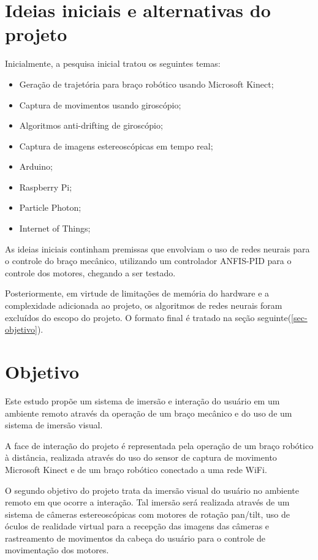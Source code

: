 		\section{Ideias iniciais e alternativas do projeto}\label{subsec-iniciais}
	
	Inicialmente, a pesquisa inicial tratou os seguintes temas:\par
	
	
	\begin{itemize}[noitemsep]
		\item Geração de trajetória para braço robótico usando Microsoft Kinect;
		\item Captura de movimentos usando giroscópio;
		\item Algoritmos anti-drifting de giroscópio;
		\item Captura de imagens estereoscópicas em tempo real;
		\item Arduino;
		\item Raspberry Pi;
		\item Particle Photon;
		\item Internet of Things;
	\end{itemize}
	As ideias iniciais continham premissas que envolviam o uso de redes neurais para o controle do braço mecânico, utilizando um controlador ANFIS-PID para o controle dos motores, chegando a ser testado.\par
	Posteriormente, em virtude de limitações de memória do hardware e a complexidade adicionada ao projeto, os algoritmos de redes neurais foram excluídos do escopo do projeto.
	O formato final é tratado na seção seguinte(\autoref{sec-objetivo}).
	\section{Objetivo}\label{sec-objetivo}

	Este estudo propõe um  sistema de imersão e interação do usuário em um ambiente remoto através da  operação de um braço mecânico e do uso de um sistema de imersão visual.\par

	A face de interação do projeto é representada pela operação de um braço robótico à distância, realizada através do uso do sensor de captura de movimento Microsoft Kinect e de um braço robótico conectado a uma rede WiFi.\par
	
	O segundo objetivo do projeto trata da imersão visual do usuário no ambiente remoto
	em que ocorre a interação. Tal imersão será realizada através de um sistema de câmeras estereoscópicas com motores de rotação pan/tilt, uso de óculos de realidade virtual para a recepção das imagens das câmeras e rastreamento de movimentos da cabeça do usuário para o controle de movimentação dos motores.\par
		
